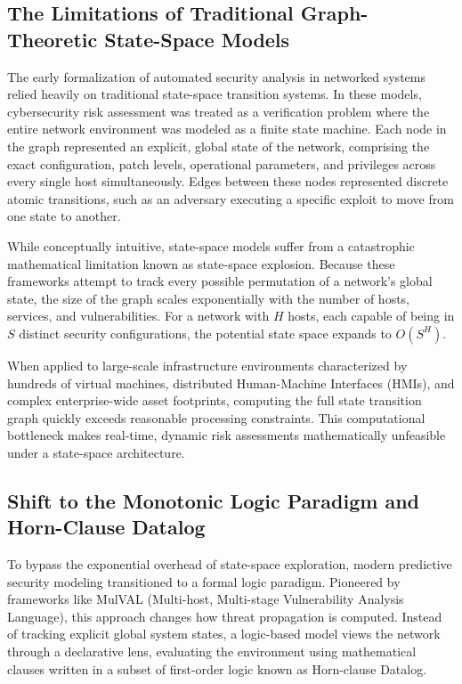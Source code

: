 \documentclass[target=mst,aauheader=aics,style=]{thud}
\begin{document}
\subsection{The Limitations of Traditional Graph-Theoretic State-Space Models}
The early formalization of automated security analysis in networked systems relied heavily on traditional state-space transition systems. In these models, cybersecurity risk assessment was treated as a verification problem where the entire network environment was modeled as a finite state machine. Each node in the graph represented an explicit, global state of the network, comprising the exact configuration, patch levels, operational parameters, and privileges across every single host simultaneously. Edges between these nodes represented discrete atomic transitions, such as an adversary executing a specific exploit to move from one state to another.

While conceptually intuitive, state-space models suffer from a catastrophic mathematical limitation known as state-space explosion. Because these frameworks attempt to track every possible permutation of a network's global state, the size of the graph scales exponentially with the number of hosts, services, and vulnerabilities. For a network with $H$ hosts, each capable of being in $S$ distinct security configurations, the potential state space expands to $O(S^H)$.

When applied to large-scale infrastructure environments characterized by hundreds of virtual machines, distributed Human-Machine Interfaces (HMIs), and complex enterprise-wide asset footprints, computing the full state transition graph quickly exceeds reasonable processing constraints. This computational bottleneck makes real-time, dynamic risk assessments mathematically unfeasible under a state-space architecture.

\subsection{Shift to the Monotonic Logic Paradigm and Horn-Clause Datalog}
To bypass the exponential overhead of state-space exploration, modern predictive security modeling transitioned to a formal logic paradigm. Pioneered by frameworks like MulVAL (Multi-host, Multi-stage Vulnerability Analysis Language), this approach changes how threat propagation is computed. Instead of tracking explicit global system states, a logic-based model views the network through a declarative lens, evaluating the environment using mathematical clauses written in a subset of first-order logic known as Horn-clause Datalog.
\end{document}
